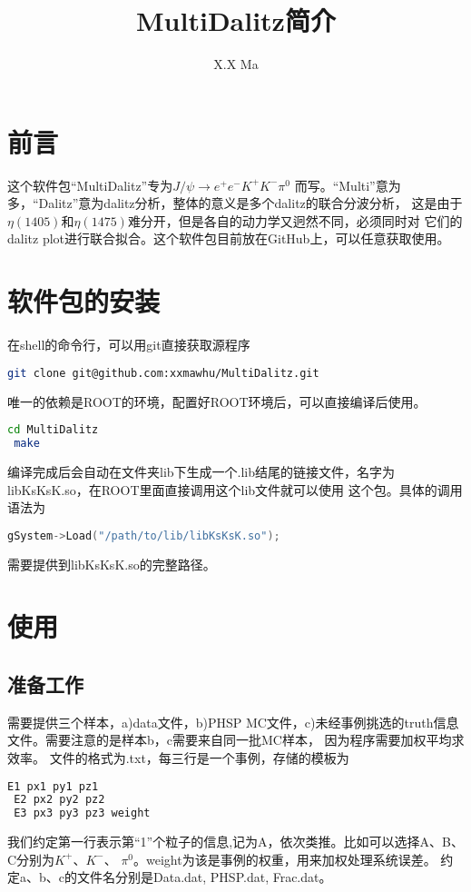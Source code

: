\documentclass[11pt,a4paper]{article}
\title{MultiDalitz简介}
\author{X.X Ma}
\begin{document}
\begin{CJK*}{UTF8}{gbsn}
\maketitle
\section{前言}
这个软件包“MultiDalitz”专为$J/\psi \to e^{+} e^{-} K^{+} K^{-} \pi^{0}$
而写。“Multi”意为多，“Dalitz”意为dalitz分析，整体的意义是多个dalitz的联合分波分析，
这是由于$\eta(1405)$和$\eta(1475)$难分开，但是各自的动力学又迥然不同，必须同时对
它们的dalitz plot进行联合拟合。这个软件包目前放在GitHub上，可以任意获取使用。
\section{软件包的安装}
在shell的命令行，可以用git直接获取源程序
\begin{lstlisting}[language=bash] 
 git clone git@github.com:xxmawhu/MultiDalitz.git 
\end{lstlisting}
唯一的依赖是ROOT的环境，配置好ROOT环境后，可以直接编译后使用。
\begin{lstlisting}[language=bash] 
 cd MultiDalitz
 make
\end{lstlisting}
编译完成后会自动在文件夹lib下生成一个.lib结尾的链接文件，名字为libKsKsK.so，在ROOT里面直接调用这个lib文件就可以使用
这个包。具体的调用语法为
\begin{lstlisting}[language=c++] 
 gSystem->Load("/path/to/lib/libKsKsK.so");
\end{lstlisting}
需要提供到libKsKsK.so的完整路径。

\section{使用}
\subsection{准备工作}
需要提供三个样本，a)data文件，b)PHSP MC文件，c)未经事例挑选的truth信息文件。需要注意的是样本b，c需要来自同一批MC样本，
因为程序需要加权平均求效率。
文件的格式为.txt，每三行是一个事例，存储的模板为
\begin{lstlisting}[language=c++] 
 E1 px1 py1 pz1
 E2 px2 py2 pz2
 E3 px3 py3 pz3 weight
\end{lstlisting}
我们约定第一行表示第“1”个粒子的信息,记为A，依次类推。比如可以选择A、B、C分别为$K^{+}$、$K^{-}$、 $\pi^{0}$。weight为该是事例的权重，用来加权处理系统误差。
约定a、b、c的文件名分别是Data.dat, PHSP.dat, Frac.dat。


\end{CJK*}
\end{document}
